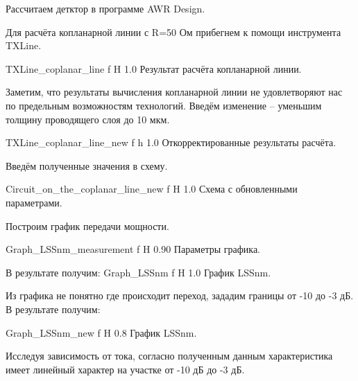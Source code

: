 \documentclass{bmstu}
\begin{document}
\indent	Рассчитаем детктор в программе AWR Design.


	Для расчёта копланарной линии с R=50 Ом прибегнем к помощи инструмента TXLine.
	
	{TXLine_coplanar_line}
	{f} %
	{H} %
	{1.0\textwidth} %
	{Результат расчёта копланарной линии.} %

	Заметим, что результаты вычисления копланарной линии не удовлетворяют нас по
	предельным возможностям технологий. Введём изменение – уменьшим толщину
	проводящего слоя до 10 мкм.

	{TXLine_coplanar_line_new}
	{f} %
	{h} %
	{1.0\textwidth} %
	{Откорректированные результаты расчёта.} %
	
	Введём полученные значения в схему.
	
	{Circuit_on_the_coplanar_line_new}
	{f} %
	{H} %
	{1.0\textwidth} %
	{Схема с обновленными параметрами.} %

	Построим график передачи мощности.
	
	{Graph_LSSnm_measurement}
	{f} %
	{H} %
	{0.90\textwidth} %
	{Параметры графика.} %

	В результате получим:
	{Graph_LSSnm}
	{f} %
	{H} %
	{1.0\textwidth} %
	{График LSSnm.} %
	
	Из графика не понятно где происходит переход, зададим границы от -10 до -3 дБ.
	В результате получим:
	
	{Graph_LSSnm_new}
	{f} %
	{H} %
	{0.8\textwidth} %
	{График LSSnm.} %
	
	Исследуя зависимость от тока, согласно полученным данным характеристика имеет линейный характер на участке от -10 дБ до -3 дБ.
	
\end{document}

